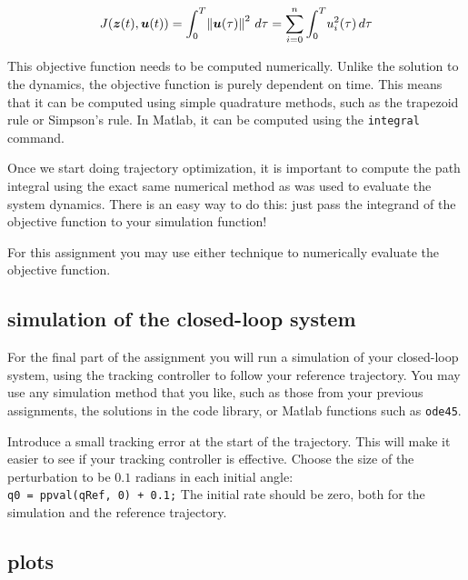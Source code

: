 \begin{equation}
  J(\bm{z}(t), \bm{u}(t))
  = \int_0^T \! \left\lVert\bm{u}(\tau)\right\rVert^2 \, d\tau
  = \sum_{i=0}^n \int_0^T \! u_i^2(\tau) \, d\tau
\end{equation}


This objective function needs to be computed numerically.
Unlike the solution to the dynamics, the objective function is purely dependent on
time. This means that it can be computed using simple quadrature methods,
such as the trapezoid rule or Simpson's rule.
In Matlab, it can be computed using the \texttt{integral} command.

\par
Once we start doing trajectory optimization, it is important to compute the
path integral using the exact same numerical method as was used to evaluate
the system dynamics. There is an easy way to do this: just pass the integrand
of the objective function to your simulation function!

For this assignment you may use either technique to numerically evaluate the objective function.

\subsection*{simulation of the closed-loop system}

For the final part of the assignment you will run a simulation of your closed-loop system,
using the tracking controller to follow your reference trajectory.
You may use any simulation method that you like, such as those from your previous assignments,
the solutions in the code library, or Matlab functions such as \texttt{ode45}.

\par Introduce a small tracking error at the start of the trajectory.
This will make it easier to see if your tracking controller is effective.
Choose the size of the perturbation to be $0.1$ radians in each initial angle: \\
\texttt{q0 = ppval(qRef, 0) + 0.1;}
The initial rate should be zero, both for the simulation and the reference trajectory.

\subsection*{plots}

